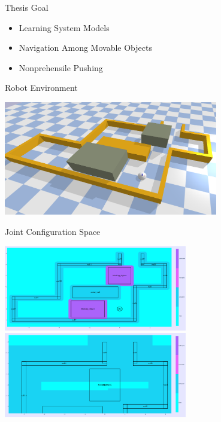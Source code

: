 \begin{frame}[fragile]{Thesis Goal} %
\begin{itemize}
  \item Learning System Models\\%
  \item Navigation Among Movable Objects\\
  \item Nonprehensile Pushing
\end{itemize}
\end{frame}

\begin{frame}[fragile]{Robot Environment} %
\begin{center}
\includegraphics[width=0.7\textwidth]{figures/introduction/2_pushes_to_freedom}
\end{center}
\end{frame}


\begin{frame}[fragile]{Joint Configuration Space}
\begin{center}
\includegraphics[width=0.6\textwidth]{figures/introduction/2_pushes_to_freedom_robot_conf_space}\vspace{2mm}
\includegraphics[width=0.6\textwidth]{figures/introduction/2_pushes_to_freedom_box_conf_space}
\end{center}
\end{frame}


